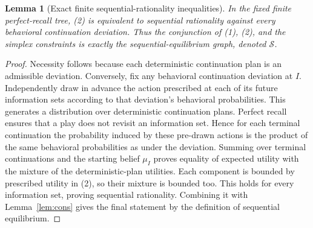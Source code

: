 \documentclass[11pt]{article}
\newtheorem{lemma}[theorem]{Lemma}
\theoremstyle{remark}\newtheorem{remark}[theorem]{Remark}
\begin{document}
\begin{lemma}[Exact finite sequential-rationality inequalities]\label{lem:SR}
In the fixed finite perfect-recall tree, (2) is equivalent to sequential rationality against every behavioral continuation deviation. Thus the conjunction of (1), (2), and the simplex constraints is exactly the sequential-equilibrium graph, denoted $\mathcal S$.
\end{lemma}
\begin{proof}
Necessity follows because each deterministic continuation plan is an admissible deviation. Conversely, fix any behavioral continuation deviation at $I$. Independently draw in advance the action prescribed at each of its future information sets according to that deviation's behavioral probabilities. This generates a distribution over deterministic continuation plans. Perfect recall ensures that a play does not revisit an information set. Hence for each terminal continuation the probability induced by these pre-drawn actions is the product of the same behavioral probabilities as under the deviation. Summing over terminal continuations and the starting belief $\mu_I$ proves equality of expected utility with the mixture of the deterministic-plan utilities. Each component is bounded by prescribed utility in (2), so their mixture is bounded too. This holds for every information set, proving sequential rationality. Combining it with Lemma~\ref{lem:cons} gives the final statement by the definition of sequential equilibrium.
\end{proof}
\end{document}
